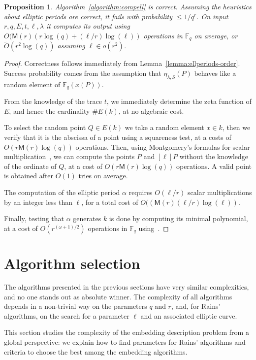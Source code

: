 \documentclass{mcom-l}
\theoremstyle{plain}
\newtheorem{proposition}[theorem]{Proposition}
\theoremstyle{definition}
\newcommand{\tildO}{\tilde{O}}
\newcommand{\F}{\ensuremath{\mathbb{F}}}
\newcommand{\MM}{\ensuremath{\mathsf{M}}}
\newcounter{algorithm}
\begin{document}
\begin{proposition}
  Algorithm~\ref{algorithm:compell} is correct. Assuming the
  heuristics about elliptic periods are correct, it fails
  with probability $\le 1/q^r$.  On input
  $r,q,E,t,\ell,\lambda$ it computes its output using
  $O(\MM(r)(r\log(q) + (\ell/r)\log(\ell))$ operations in $\F_q$ on average, or
  $\tildO(r^2\log(q))$ assuming $\ell\in o(r^2)$.
\end{proposition}
\begin{proof}
  Correctness follows immediately from
  Lemma~\ref{lemma:ellperiods-order}. Success probability comes from
  the assumption that $\eta_{\lambda,S}(P)$ behaves like a random element of
  $\F_q(x(P))$.

  From the knowledge of the trace $t$, we immediately determine the
  zeta function of $E$, and hence the cardinality $\# E(k)$, at
  no algebraic cost.

  To select the random point $Q\in E(k)$ we take a random
  element $x\in k$, then we verify that it is the abscissa of a
  point using a squareness test, at a costs of $O(r\MM(r)\log(q))$
  operations. Then, using Montgomery's formulas for scalar
  multiplication~\cite{montgomery}, we can compute the points $P$ and
  $[\ell]P$ without the knowledge of the ordinate of $Q$, at a cost of
  $O(r\MM(r)\log(q))$ operations. A valid point is obtained after
  $O(1)$ tries on average.

  The computation of the elliptic period $\alpha$ requires $O(\ell/r)$ scalar
  multiplications by an integer less than $\ell$, for a total cost of
  $O((\MM(r)(\ell/r)\log(\ell))$.

  Finally, testing that $\alpha$ generates $k$ is done by computing
  its minimal polynomial, at a cost of $O(r^{(\omega+1)/2})$ operations in
  $\F_q$ using~\cite{shoup93}.
\end{proof}


\section{Algorithm selection}
\label{sec:selection}

The algorithms presented in the previous sections have very similar
complexities, and no one stands out as absolute winner. %
The complexity of all algorithms depends in a non-trivial way on the
parameters $q$ and $r$, and, for Rains' algorithms, on the search for
a parameter $\ell$ and an associated elliptic curve.

This section studies the complexity of the embedding description
problem from a global perspective: we explain how to find parameters
for Rains' algorithms and criteria to choose the best among the
embedding algorithms.
\end{document}
